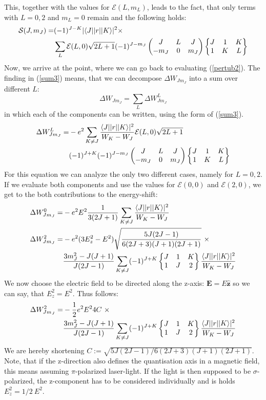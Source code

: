 This, together with the values for $\mathcal{E}(L,m_L)$, leads to the fact, that only terms with $L=0,2$ and $m_L=0$ remain and the following holds:
\begin{align}
\mathcal{S}(J,m_J)=&(-1)^{J-K}|\langle J| |r| | K\rangle|^2\times\notag\\&\sum_{L}\mathcal{E}(L,0)\sqrt{2L+1} (-1)^{J-m_J}\begin{pmatrix}J&L&J\\-m_J&0&m_J\end{pmatrix}\begin{Bmatrix}J&1&K\\1&K&L\end{Bmatrix}\label{sum3}
\end{align}
Now, we arrive at the point, where we can go back to evaluating (\ref{pertub2}). The finding in (\ref{sum3}) means, that we can decompose $\Delta W_{Jm_J}$ into a sum over different $L$:
\begin{equation}
\Delta W_{Jm_J}=\sum_L\Delta W^L_{Jm_J}
\end{equation}
in which each of the components can be written, using the form of (\ref{sum3}).
\begin{align}
\Delta W^L_{Jm_J}=&-e^2\sum_{K\neq J}\frac{\langle J| |r| | K\rangle|^2}{W_K-W_J}\mathcal{E}(L,0)\sqrt{2L+1}\notag\\&(-1)^{J+K} (-1)^{J-m_J}\begin{pmatrix}J&L&J\\-m_J&0&m_J\end{pmatrix}\begin{Bmatrix}J&1&K\\1&K&L\end{Bmatrix}\label{pertub4}
\end{align}
For this equation we can analyze the only two different cases, namely for $L=0,2$. If we evaluate both components and use the values for $\mathcal{E}(0,0)$ and $\mathcal{E}(2,0)$, we get to the both contributions to the energy-shift:
\begin{align}
\Delta W^0_{Jm_J}=&-e^2E^2\frac{1}{3(2J+1)}\sum_{K\neq J}\frac{\braopket{J}{|r|}{K}|^2}{W_K-W_J}\\
\Delta W^2_{Jm_J}=&-e^2(3E^2_z-E^2)\sqrt{\frac{5J(2J-1)}{6(2J+3)(J+1)(2J+1)}}\ \times\notag\\
&\frac{3m^2_J-J(J+1)}{J(2J-1)}\sum_{K\neq J}(-1)^{J+K}\sixj{J}{1}{K}{1}{J}{2}\frac{\braopket{J}{|r|}{K}|^2}{W_K-W_J}
\end{align}
We now choose the electric field to be directed along the z-axis: $\boldsymbol{E}=E\hat{\boldsymbol{z}}$ so we can say, that $E^2_z=E^2$. Thus follows:
\begin{align}
\Delta W^2_{Jm_J}=&-\frac{1}{2}e^2E^24C\ \times\notag\\
&\frac{3m^2_J-J(J+1)}{J(2J-1)}\sum_{K\neq J}(-1)^{J+K}\begin{Bmatrix}J&1&K\\1&J&2\end{Bmatrix}\frac{\langle J| |r| | K\rangle|^2}{W_K-W_J}\label{alpha21}
\end{align}
We are hereby shortening $C:=\sqrt{5J(2J-1)/6(2J+3)(J+1)(2J+1)}$.
Note, that if the z-direction also defines the quantisation axis in a magnetic field, this means assuming $\pi$-polarized laser-light. If the light is then supposed to be $\sigma$-polarized, the z-component has to be considered individually and is holds $E^2_z=1/2\ E^2$.
